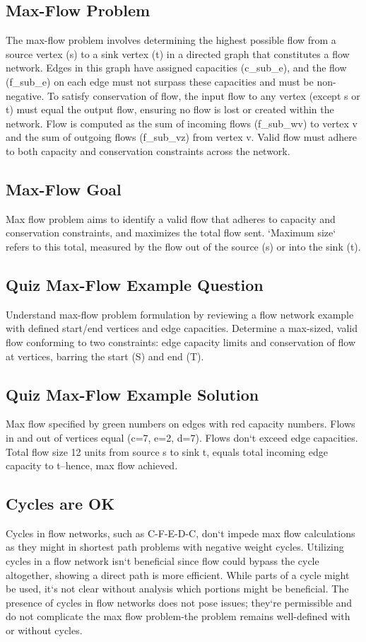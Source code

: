 \subsection*{Max-Flow Problem}
The max-flow problem involves determining the highest possible flow from a source vertex (s) to a sink vertex (t) in a directed graph that constitutes a flow network.
Edges in this graph have assigned capacities (c\_sub\_e), and the flow (f\_sub\_e) on each edge must not surpass these capacities and must be non-negative.
To satisfy conservation of flow, the input flow to any vertex (except s or t) must equal the output flow, ensuring no flow is lost or created within the network.
Flow is computed as the sum of incoming flows (f\_sub\_wv) to vertex v and the sum of outgoing flows (f\_sub\_vz) from vertex v.
Valid flow must adhere to both capacity and conservation constraints across the network.

\subsection*{Max-Flow Goal}
Max flow problem aims to identify a valid flow that adheres to capacity and conservation constraints, and maximizes the total flow sent.
`Maximum size` refers to this total, measured by the flow out of the source (s) or into the sink (t).

\subsection*{Quiz  Max-Flow Example Question}
Understand max-flow problem formulation by reviewing a flow network example with defined start/end vertices and edge capacities.
Determine a max-sized, valid flow conforming to two constraints: edge capacity limits and conservation of flow at vertices, barring the start (S) and end (T).

\subsection*{Quiz  Max-Flow Example Solution}
Max flow specified by green numbers on edges with red capacity numbers.
Flows in and out of vertices equal (c=7, e=2, d=7).
Flows don`t exceed edge capacities.
Total flow size 12 units from source s to sink t, equals total incoming edge capacity to t--hence, max flow achieved.

\subsection*{Cycles are OK}
Cycles in flow networks, such as C-F-E-D-C, don`t impede max flow calculations as they might in shortest path problems with negative weight cycles.
Utilizing cycles in a flow network isn`t beneficial since flow could bypass the cycle altogether, showing a direct path is more efficient.
While parts of a cycle might be used, it`s not clear without analysis which portions might be beneficial.
The presence of cycles in flow networks does not pose issues; they`re permissible and do not complicate the max flow problem-the problem remains well-defined with or without cycles.

